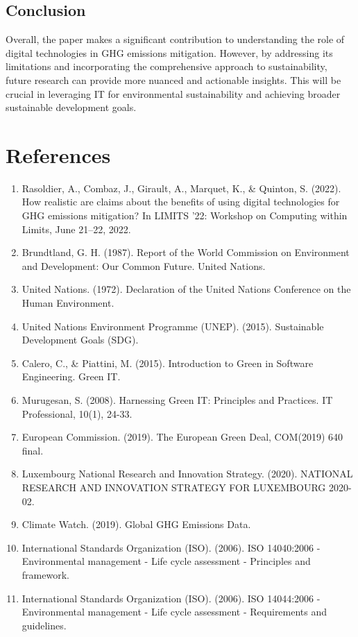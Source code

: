 \documentclass[conference,compsoc]{IEEEtran}
\begin{document}
\subsection{Conclusion}

Overall, the paper makes a significant contribution to understanding the role of digital technologies in GHG emissions mitigation. However, by addressing its limitations and incorporating the  comprehensive approach to sustainability, future research can provide more nuanced and actionable insights. This will be crucial in leveraging IT for environmental sustainability and achieving broader sustainable development goals.

\section*{References}

\begin{enumerate}
	\item Rasoldier, A., Combaz, J., Girault, A., Marquet, K., \& Quinton, S. (2022). How realistic are claims about the benefits of using digital technologies for GHG emissions mitigation? In LIMITS '22: Workshop on Computing within Limits, June 21–22, 2022.
	\item Brundtland, G. H. (1987). Report of the World Commission on Environment and Development: Our Common Future. United Nations.
	\item United Nations. (1972). Declaration of the United Nations Conference on the Human Environment.
	\item United Nations Environment Programme (UNEP). (2015). Sustainable Development Goals (SDG).
	\item Calero, C., \& Piattini, M. (2015). Introduction to Green in Software Engineering. Green IT.
	\item Murugesan, S. (2008). Harnessing Green IT: Principles and Practices. IT Professional, 10(1), 24-33.
	\item European Commission. (2019). The European Green Deal, COM(2019) 640 final.
	\item Luxembourg National Research and Innovation Strategy. (2020). NATIONAL RESEARCH AND INNOVATION STRATEGY FOR LUXEMBOURG 2020-02.
	\item Climate Watch. (2019). Global GHG Emissions Data.
	\item International Standards Organization (ISO). (2006). ISO 14040:2006 - Environmental management - Life cycle assessment - Principles and framework.
	\item International Standards Organization (ISO). (2006). ISO 14044:2006 - Environmental management - Life cycle assessment - Requirements and guidelines.
\end{enumerate}
\end{document}
